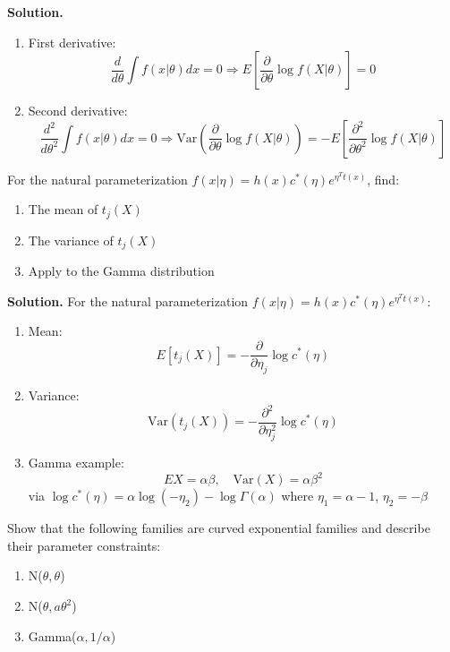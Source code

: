 \noindent\textbf{Solution.}
\begin{enumerate}[label=(\alph*)]
\item First derivative:
\[ \frac{d}{d\theta}\int f(x|\theta)dx = 0 \Rightarrow E\left[\frac{\partial}{\partial\theta}\log f(X|\theta)\right] = 0 \]

\item Second derivative:
\[ \frac{d^2}{d\theta^2}\int f(x|\theta)dx = 0 \Rightarrow \text{Var}\left(\frac{\partial}{\partial\theta}\log f(X|\theta)\right) = -E\left[\frac{\partial^2}{\partial\theta^2}\log f(X|\theta)\right] \]
\end{enumerate}

\begin{problembox}
For the natural parameterization $f(x|\eta) = h(x)c^*(\eta)e^{\eta^T t(x)}$, find:
\begin{enumerate}
\item The mean of $t_j(X)$
\item The variance of $t_j(X)$
\item Apply to the Gamma distribution
\end{enumerate}
\end{problembox}

\noindent\textbf{Solution.}
For the natural parameterization $f(x|\eta) = h(x)c^*(\eta)e^{\eta^T t(x)}$:
\begin{enumerate}
\item Mean:
\[ E[t_j(X)] = -\frac{\partial}{\partial\eta_j}\log c^*(\eta) \]

\item Variance:
\[ \text{Var}(t_j(X)) = -\frac{\partial^2}{\partial\eta_j^2}\log c^*(\eta) \]

\item Gamma example:
\[ EX = \alpha\beta, \quad \text{Var}(X) = \alpha\beta^2 \]
via $\log c^*(\eta) = \alpha\log(-\eta_2) - \log\Gamma(\alpha)$ where $\eta_1 = \alpha-1$, $\eta_2 = -\beta$
\end{enumerate}

\begin{problembox}
Show that the following families are curved exponential families and describe their parameter constraints:
\begin{enumerate}[label=(\alph*)]
\item N($\theta,\theta$)
\item N($\theta,a\theta^2$)
\item Gamma($\alpha,1/\alpha$)
\end{enumerate}
\end{problembox}

